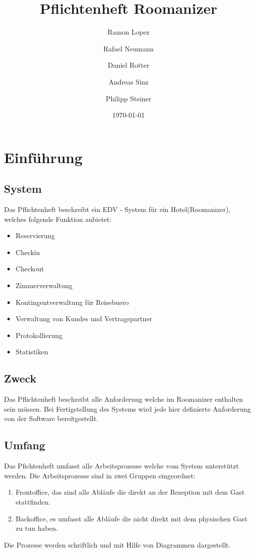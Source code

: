 \documentclass[10pt,a4paper,titlepage]{article}
\begin{document}
\fancyhf{}

\lhead{\leftmark}

\setcounter{secnumdepth}{5}
\setcounter{tocdepth}{3}

\title{Pflichtenheft Roomanizer}
\author{Ramon Lopez \and Rafael Neumann \and Daniel Rotter \and Andreas Sinz \and Philipp Steiner}
\date{\today}
\maketitle

\tableofcontents
\newpage
\section{Einführung}
\subsection{System}
Das Pflichtenheft beschreibt ein EDV - System für ein Hotel(Roomanizer), welches 
folgende Funktion anbietet:
\begin{itemize}
	\item \Gls{Reservierung}
	\item \Gls{Checkin}
	\item \Gls{Checkout}
	\item Zimmerverwaltung
	\item Kontingentverwaltung für \Gls{Reisebuero}
	\item Verwaltung von \Glspl{Kunde} und \Gls{Vertragspartner}
	\item Protokollierung
	\item Statistiken
\end{itemize}
\subsection{Zweck}
Das Pflichtenheft beschreibt alle Anforderung welche im Roomanizer enthalten sein müssen. Bei Fertigstellung des Systems wird jede hier definierte Anforderung von der Software bereitgestellt.
\subsection{Umfang}
Das Pfichtenheft umfasst alle Arbeitsprozesse welche vom System unterstützt werden. 
Die Arbeitsprozesse sind in zwei Gruppen eingeordnet:
\begin{enumerate}
\item \Gls{Frontoffice}, das sind alle Abläufe die direkt an der \Gls{Rezeption} mit dem \Gls{Gast} stattfinden.
\item \Gls{Backoffice}, es umfasst alle Abläufe die nicht direkt mit dem physischen \Gls{Gast} zu tun haben.
\end{enumerate}
Die Prozesse werden schriftlich und mit Hilfe von Diagrammen dargestellt.
\end{document}
